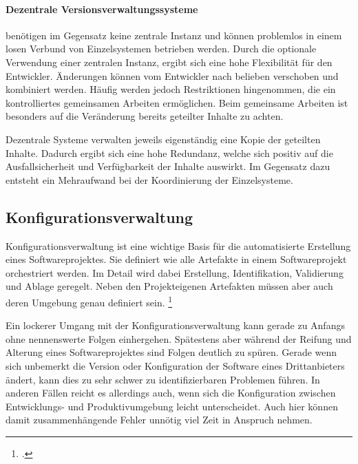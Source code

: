 \paragraph{Dezentrale Versionsverwaltungssysteme} benötigen im Gegensatz keine zentrale Instanz und können problemlos in 
einem losen Verbund von Einzelsystemen betrieben werden. 
Durch die optionale Verwendung einer zentralen Instanz, ergibt sich eine hohe Flexibilität für den Entwickler. Änderungen 
können vom Entwickler nach belieben verschoben und kombiniert werden.
Häufig werden jedoch Restriktionen hingenommen, die ein kontrolliertes gemeinsamen Arbeiten ermöglichen. Beim gemeinsame 
Arbeiten ist besonders auf die Veränderung bereits geteilter Inhalte zu achten.
 
Dezentrale Systeme verwalten jeweils eigenständig eine Kopie der geteilten Inhalte. Dadurch ergibt sich eine hohe 
Redundanz, welche sich positiv auf die Ausfallsicherheit und Verfügbarkeit der Inhalte auswirkt. Im Gegensatz dazu 
entsteht ein Mehraufwand bei der Koordinierung der Einzelsysteme.

\subsection{Konfigurationsverwaltung}
\label{subsec:konfigurationsverwaltung}

Konfigurationsverwaltung ist eine wichtige Basis für die automatisierte Erstellung eines Softwareprojektes. Sie definiert wie alle Artefakte in einem Softwareprojekt orchestriert werden. Im Detail wird dabei Erstellung, Identifikation, Validierung und Ablage geregelt. Neben den Projekteigenen Artefakten müssen aber auch deren Umgebung genau definiert sein. \footcite{humble2010}

Ein lockerer Umgang mit der Konfigurationsverwaltung kann gerade zu Anfangs ohne nennenswerte Folgen einhergehen. Spätestens aber während der Reifung und Alterung eines Softwareprojektes sind Folgen deutlich zu spüren. Gerade wenn sich unbemerkt die Version oder Konfiguration der Software eines Drittanbieters ändert, kann dies zu sehr schwer zu identifizierbaren Problemen führen. In anderen Fällen reicht es allerdings auch, wenn sich die Konfiguration zwischen Entwicklungs- und Produktivumgebung leicht unterscheidet. Auch hier können damit zusammenhängende Fehler unnötig viel Zeit in Anspruch nehmen.

